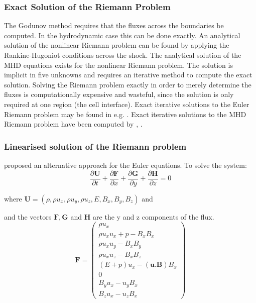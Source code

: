 \subsubsection{Exact Solution of the Riemann Problem}
The Godunov method requires that the fluxes across the boundaries be computed.
In the hydrodynamic case this can be done exactly.
An analytical solution of the nonlinear Riemann problem can be found by applying the Rankine-Hugoniot conditions across the shock.
The analytical solution of the MHD equations exists for the nonlinear Riemann problem.
The solution is implicit in five unknowns and requires an iterative method to compute the exact solution.
Solving the Riemann problem exactly in order to merely determine the fluxes is computationally expensive and wasteful, since the solution is only required at one region (the cell interface).
Exact iterative solutions to the Euler Riemann problem may be found in e.g. \citet{Toro:1997:RSN}.
Exact iterative solutions to the MHD Riemann problem have been computed by \citet{1988JCoPh..75..400B}, \citet{1998MNRAS.297..265F}.

\subsubsection{Linearised solution of the Riemann problem}
\citet{Roe81:_approx} proposed an alternative approach for the Euler equations.
To solve the system:
\begin{equation}
\frac{\partial \mathbf{U} }{\partial t}+
\frac{\partial \mathbf{F} }{\partial x}
+
\frac{\partial \mathbf{G} }{\partial y}
+
\frac{\partial \mathbf{H} }{\partial z}
=0
\end{equation}

where
$
\mathbf{U}=\left(
\rho , 
\rho u_x ,
\rho u_y  ,
\rho u_z  ,
E ,
B_x,
B_y  ,
B_z 
\right)
$
and 


and the vectors $ \mathbf{F} , \mathbf{G}$ and $ \mathbf{H}$ are the y and z components of the flux.
\begin{equation}
\mathbf{F}=\left(
\begin{array}{c}
\rho u_x \\
\rho u_x u_x +p - B_x B_x  \\
\rho u_x u_y  - B_x B_y \\
\rho u_x u_z  - B_x B_z\\
(E+p)u_x - (\mathbf{u.B})B_x \\
0\\
B_y u_x - u_y B_x\\
B_z u_x -u_z B_x 
\end{array}
\right)
\end{equation}

